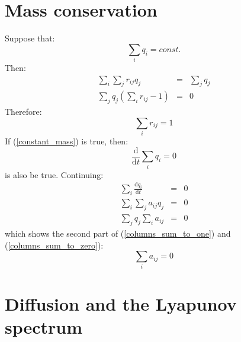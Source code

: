\documentclass{article}
\begin{document}
\appendix

\section{Mass conservation}

\label{mass_conservation_derivation}

Suppose that:
\begin{equation}
	\sum_i q_i = const.
	\label{constant_mass}
\end{equation}
Then:
\begin{eqnarray}
	\sum_i \sum_j r_{ij} q_j & = & \sum_j q_j \\
	\sum_j q_j \left ( \sum_i r_{ij} - 1 \right ) & = & 0
\end{eqnarray}
Therefore:
\begin{equation}
	\sum_i r_{ij} = 1
\end{equation}
If (\ref{constant_mass}) is true, then:
\begin{equation}
	\frac{\mathrm d}{\mathrm d t}\sum_i q_i = 0
\end{equation}
is also be true. Continuing:
\begin{eqnarray}
	\sum_i \frac{\mathrm d q_i}{\mathrm d t} & = & 0 \\
\sum_i \sum_j a_{ij} q_j & = & 0 \\
\sum_j q_j \sum_i a_{ij} & = & 0
\end{eqnarray}
which shows the second part of (\ref{columns_sum_to_one}) and 
(\ref{columns_sum_to_zero}):
\begin{equation}
	\sum_i a_{ij} = 0
\end{equation}

\section{Diffusion and the Lyapunov spectrum}

\label{Lyapunov_exponents_less_than_zero}
\end{document}
